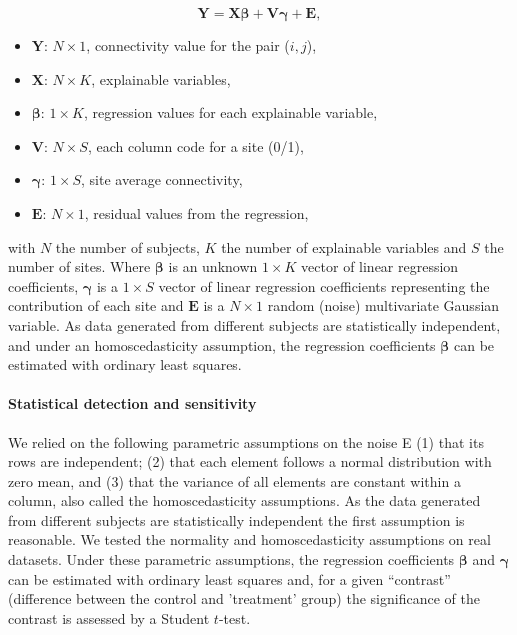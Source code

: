 \documentclass[authoryear]{elsarticle}
\begin{document}
\begin{equation}
 \label{eq_glm_dummy}
  \mathbf{Y} = \mathbf{X}\mathbf{\beta} + \mathbf{V}\mathbf{\gamma}+ \mathbf{E},
\end{equation}
\begin{itemize}
  \item $\mathbf{Y}$: $N\times 1$, connectivity value for the pair ($i,j$),
  \item $\mathbf{X}$: $N\times K$, explainable variables,
  \item $\mathbf{\beta}$: $1 \times K$, regression values for each explainable variable,
  \item $\mathbf{V}$: $N\times S$, each column code for a site (0/1),
  \item $\mathbf{\gamma}$: $1\times S$, site average connectivity,
  \item $\mathbf{E}$: $N\times 1$, residual values from the regression,
\end{itemize}
 
with $N$ the number of subjects, $K$ the number of explainable variables and $S$ the number of sites. Where $\mathbf{\beta}$ is an unknown $1\times K$ vector of linear regression coefficients, $\mathbf{\gamma}$ is a $1\times S$ vector of linear regression coefficients representing the contribution of each site and $\mathbf{E}$ is a $N\times 1$ random (noise) multivariate Gaussian variable. As data generated from different subjects are statistically independent, and under an homoscedasticity assumption, the regression coefficients $\mathbf{\beta}$ can be estimated with ordinary least squares.

\paragraph{Statistical detection and sensitivity}

We relied on the following parametric assumptions on the noise E (1) that its rows are independent; (2) that each element follows a normal distribution with zero mean, and (3) that the variance of all elements are constant within a column, also called the homoscedasticity assumptions. As the data generated from different subjects are statistically independent the first assumption is reasonable. We tested the normality and homoscedasticity assumptions on real datasets. Under these parametric assumptions, the regression coefficients $\mathbf{\beta}$ and $\mathbf{\gamma}$ can be estimated with ordinary least squares and, for a given “contrast” (difference between the control and 'treatment' group) the significance of the contrast is assessed by a Student $t$-test.
\end{document}
